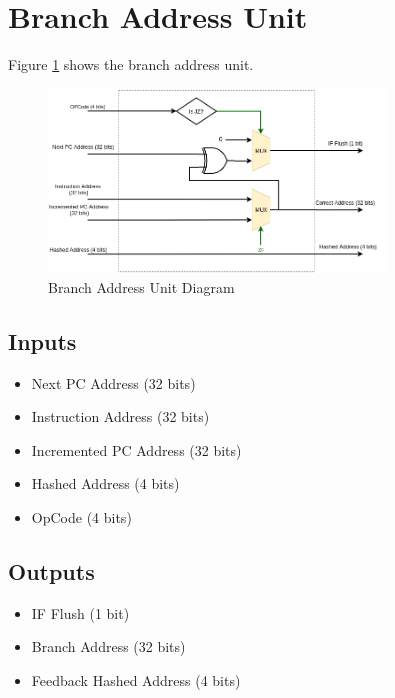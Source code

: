 \section{Branch Address Unit}
Figure \ref{fig:bau} shows the branch address unit.
\begin{figure}[hp]
    \centering
    \includegraphics[width=0.8\textwidth]{images/bau.png}
    \caption{Branch Address Unit Diagram}
    \label{fig:bau}
\end{figure}

\subsection{Inputs}
\begin{itemize}
    \item Next PC Address (32 bits)
    \item Instruction Address (32 bits)
    \item Incremented PC Address (32 bits)
    \item Hashed Address (4 bits)
    \item OpCode (4 bits)
\end{itemize}

\subsection{Outputs}
\begin{itemize}
    \item IF Flush (1 bit)
    \item Branch Address (32 bits)
    \item Feedback Hashed Address (4 bits)
\end{itemize}

